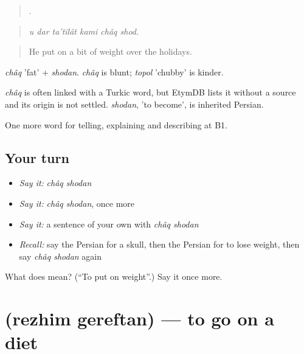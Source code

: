 \begin{quote}
     .
\end{quote}

\begin{quote}
\emph{u dar ta'tilât kami châq shod.}
\end{quote}

\begin{quote}
He put on a bit of weight over the holidays.
\end{quote}

\emph{châq} 'fat' + \emph{shodan}. \emph{châq} is blunt; \emph{topol} 'chubby' is kinder.

\begin{cousinweb}
\emph{châq} is often linked with a Turkic word, but EtymDB lists it without a source and its origin is not settled. \emph{shodan}, 'to become', is inherited Persian.
\end{cousinweb}

\begin{grammarlens}[title={What you've built}]
One more word for telling, explaining and describing at B1.
\end{grammarlens}

\subsection*{Your turn}
\begin{itemize}
\raggedright
  \item \emph{Say it:} \emph{châq shodan}
  \item \emph{Say it:} \emph{châq shodan}, once more
  \item \emph{Say it:} a sentence of your own with \emph{châq shodan}
  \item \emph{Recall:} say the Persian for a skull, then the Persian for to lose weight, then say \emph{châq shodan} again
\end{itemize}

\begin{tcolorbox}[breakable,colback=teal!4,colframe=teal!35!black,title={Before you move on}]
What does   mean? (\textquotedblleft{}To put on weight\textquotedblright{}.) Say it once more.
\end{tcolorbox}
\section[\texorpdfstring{\fa{رژیم} \fa{گرفتن} (rezhim gereftan)}{رژیم گرفتن (rezhim gereftan)}]{  (rezhim gereftan) — to go on a diet}

